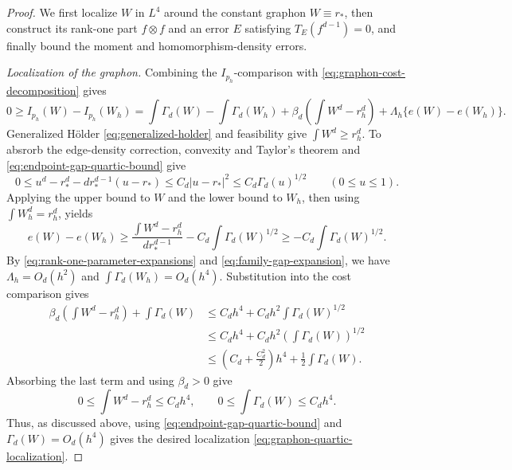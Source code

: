 \begin{proof}
We first localize $W$ in $L^4$ around the constant graphon $W\equiv r_*$,
then construct its rank-one part $f\otimes f$ and an error $E$ satisfying
$T_E(f^{d-1})=0$, and finally bound the moment and homomorphism-density
errors.

\medskip
\noindent\emph{Localization of the graphon.}
Combining the $I_{p_h}$-comparison with \eqref{eq:graphon-cost-decomposition} gives
\[
  0\ge I_{p_h}(W)-I_{p_h}(W_h)
  =\int\Gamma_d(W)-\int\Gamma_d(W_h)
  +\beta_d\left(\int W^d-r_h^d\right)
  +\Lambda_h\{e(W)-e(W_h)\}.
\]
Generalized H\"older \eqref{eq:generalized-holder} and feasibility give $\int W^d\ge r_h^d$.
To absrorb the edge-density correction, convexity and Taylor's theorem and
\eqref{eq:endpoint-gap-quartic-bound} give
\[
  0\le u^d-r_*^d-d r_*^{d-1}(u-r_*)
  \le C_d|u-r_*|^2
  \le C_d\Gamma_d(u)^{1/2}
  \qquad(0\le u\le1).
\]
Applying the upper bound to $W$ and the lower bound to $W_h$, then using
$\int W_h^d=r_h^d$, yields
\[
  e(W)-e(W_h)
  \ge\frac{\int W^d-r_h^d}{d r_*^{d-1}}
   -C_d\int\Gamma_d(W)^{1/2}
  \ge-C_d\int\Gamma_d(W)^{1/2}.
\]
By \eqref{eq:rank-one-parameter-expansions} and \eqref{eq:family-gap-expansion},
we have $\Lambda_h=O_d(h^2)$ and $\int\Gamma_d(W_h)=O_d(h^4)$.
Substitution into the cost comparison gives
\begin{align*}
  \beta_d \left(\int W^d-r_h^d\right)+\int\Gamma_d(W)
  &\le C_dh^4+C_dh^2\int\Gamma_d(W)^{1/2}\\
  &\le C_dh^4+C_dh^2\left(\int\Gamma_d(W)\right)^{1/2}\\
  &\le \left(C_d+\frac{C_d^2}{2}\right)h^4+\frac12\int\Gamma_d(W).
\end{align*}
Absorbing the last term and using $\beta_d>0$ give
\begin{equation}\label{eq:moment-and-cost-gap-bounds}
  0\le\int W^d-r_h^d\le C_dh^4,
  \qquad
  0\le\int\Gamma_d(W)\le C_dh^4.
\end{equation}
Thus, as discussed above, using \eqref{eq:endpoint-gap-quartic-bound} and $\Gamma_d(W)=O_d(h^4)$
gives the desired localization \eqref{eq:graphon-quartic-localization}.


\end{proof}
